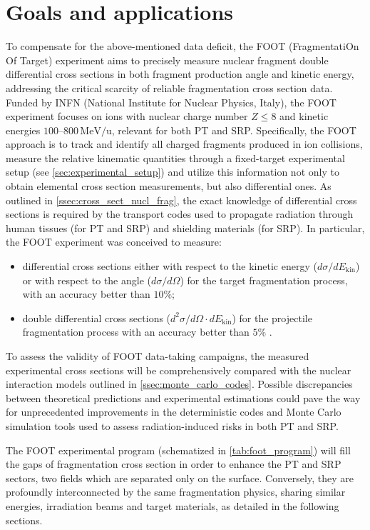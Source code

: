 \section{Goals and applications}\label{sec:foot_aim}
To compensate for the above-mentioned data deficit, the FOOT (FragmentatiOn Of Target) experiment aims to precisely measure nuclear fragment double differential cross sections in both fragment production angle and kinetic energy, addressing the critical scarcity of reliable fragmentation cross section data. Funded by INFN (National Institute for Nuclear Physics, Italy), the FOOT experiment focuses on ions with nuclear charge number $Z\leq8$ and kinetic energies $100$--$800\,\mathrm{MeV/u}$, relevant for both PT and SRP. Specifically, the FOOT approach is to track and identify all charged fragments produced in ion collisions, measure the relative kinematic quantities through a fixed-target experimental setup (see \autoref{sec:experimental_setup}) and utilize this information not only to obtain elemental cross section measurements, but also differential ones. As outlined in \autoref{ssec:cross_sect_nucl_frag}, the exact knowledge of differential cross sections is required by the transport codes used to propagate radiation through human tissues (for PT and SRP) and shielding materials (for SRP). In particular, the FOOT experiment was conceived to measure:
\begin{itemize}
	\item differential cross sections either with respect to the kinetic energy ($d\sigma/dE_{\text{kin}}$) or with respect to the angle ($d\sigma/d\Omega$) for the target fragmentation process, with an accuracy better than $10\%$;
	\item double differential cross sections ($d^2\sigma/d\Omega\cdot dE_{\text{kin}}$) for the projectile fragmentation process with an accuracy better than $5\%$ \cite{measurement_impact_foot}.
\end{itemize}\noindent
To assess the validity of FOOT data-taking campaigns, the measured experimental cross sections will be comprehensively compared with the nuclear interaction models outlined in \autoref{ssec:monte_carlo_codes}. Possible discrepancies between theoretical predictions and experimental estimations could pave the way for unprecedented improvements in the deterministic codes and Monte Carlo simulation tools used to assess radiation-induced risks in both PT and SRP.

The FOOT experimental program (schematized in \autoref{tab:foot_program}) will fill the gaps of fragmentation cross section in order to enhance the PT and SRP sectors, two fields which are separated only on the surface. Conversely, they are profoundly interconnected by the same fragmentation physics, sharing similar energies, irradiation beams and target materials, as detailed in the following sections.
